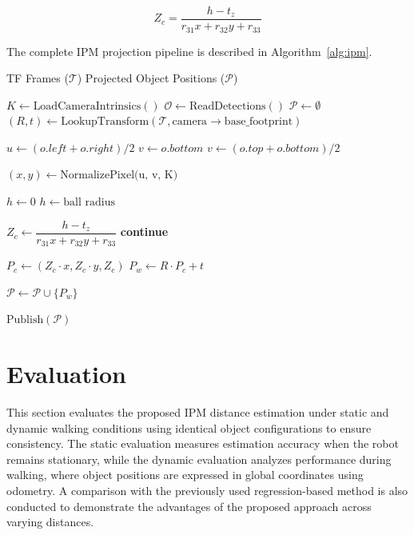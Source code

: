 \documentclass[journal]{IAENGtran}
\begin{document}
\begin{equation} \label{eq:zc_final}
Z_c = \frac{h - t_z}{r_{31}x + r_{32}y + r_{33}}
\end{equation}

The complete IPM projection pipeline is described in
Algorithm~\ref{alg:ipm}.

\begin{algorithm}[!h]
\caption{IPM Package}
\label{alg:ipm}
\footnotesize
\begin{algorithmic}[1]
\Require TF Frames ($\mathcal{T}$)
\Ensure Projected Object Positions ($\mathcal{P}$)

\State $K \gets \text{LoadCameraIntrinsics}()$
    \State $\mathcal{O} \gets \text{ReadDetections}()$
    \State $\mathcal{P} \gets \emptyset$
    \State $(R, t) \gets \text{LookupTransform}(\mathcal{T}, \text{camera} \rightarrow \text{base\_footprint})$

        \State $u \gets (o.left + o.right)/2$
            \State $v \gets o.bottom$
        \Else
            \State $v \gets (o.top + o.bottom)/2$
        \EndIf

        \State $(x, y) \gets \text{NormalizePixel(u, v, K)}$

        \State $h \gets 0$
            \State $h \gets \text{ball radius}$
        \EndIf

        \State $Z_c \gets \dfrac{h - t_z}{r_{31}x + r_{32}y + r_{33}}$
            \State \textbf{continue}
        \EndIf

        \State $P_c \gets (Z_c \cdot x, Z_c \cdot y, Z_c)$
        \State $P_w \gets R \cdot P_c + t$

        \State $\mathcal{P} \gets \mathcal{P} \cup \{P_w\}$

    \EndFor

    \State $\text{Publish}(\mathcal{P})$
\EndWhile

\end{algorithmic}
\end{algorithm}

\section{Evaluation}

This section evaluates the proposed IPM distance estimation under static
and dynamic walking conditions using identical object configurations to ensure
consistency. The static evaluation measures estimation accuracy when the robot remains
stationary, while the dynamic evaluation analyzes performance during
walking, where object positions are expressed in global coordinates
using odometry. A comparison with the previously used regression-based
method is also conducted to demonstrate the advantages of the proposed
approach across varying distances.
\end{document}

